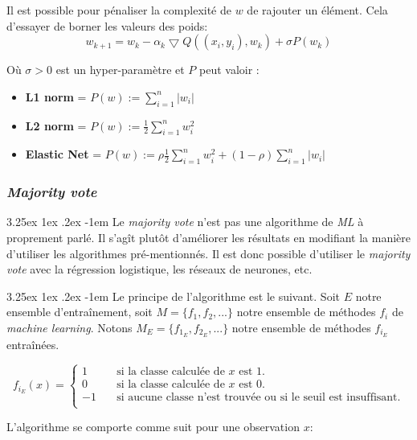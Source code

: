 \documentclass[a4paper, 11pt]{article}
\makeatletter
\renewcommand\paragraph{\@startsection{paragraph}{5}{\z@}%
  {3.25ex \@plus1ex \@minus.2ex}%
  {-1em}%
  {\normalfont\normalsize\bfseries}}
\makeatother
\begin{document}
Il est possible pour pénaliser la complexité de $w$ de rajouter un élément. Cela d'essayer de borner les valeurs des poids:
$$w_{k+1} = w_k -\alpha_k \bigtriangledown Q ((x_i,y_i), w_k) + \sigma P(w_k)$$

Où $\sigma > 0$ est un hyper-paramètre et $P$ peut valoir :
\begin{itemize}
\item \textbf{L1 norm} = $P(w) := \sum\limits_{i=1}^n |w_i|$
\item \textbf{L2 norm} = $P(w) := \frac{1}{2}\sum\limits_{i=1}^n w_i^2$
\item \textbf{Elastic Net} = $P(w) := \rho \frac{1}{2}\sum\limits_{i=1}^n w_i^2 + (1 - \rho) \sum\limits_{i=1}^n |w_i|$
\end{itemize}


\subsubsection{\textit{Majority vote}} \label{section majority vote}
\paragraph{}
Le \textit{majority vote} n'est pas une algorithme de \textit{ML} à proprement parlé. Il s'agît plutôt d'améliorer les résultats en modifiant la manière d'utiliser les algorithmes pré-mentionnés.
Il est donc possible d'utiliser le \textit{majority vote} avec la régression logistique, les réseaux de neurones, etc.

\paragraph{}
Le principe de l'algorithme est le suivant. Soit $E$ notre ensemble d'entraînement, soit $M = \{f_1, f_2, ...\}$ notre ensemble de méthodes $f_i$ de \textit{machine learning}. Notons $M_E = \{f_{1_E}, f_{2_E}, ...\}$ notre ensemble de méthodes $f_{i_E}$ entraînées.
 
\[ f_{i_E}(x) =
  \begin{cases}
    1       & \quad \text{si la classe calculée de $x$ est 1.}\\
    0  & \quad \text{si la classe calculée de $x$ est 0.}\\
    -1 & \quad \text{si aucune classe n'est trouvée ou si le seuil est insuffisant.}\\
  \end{cases}
\]

L'algorithme se comporte comme suit pour une observation $x$:
\end{document}
